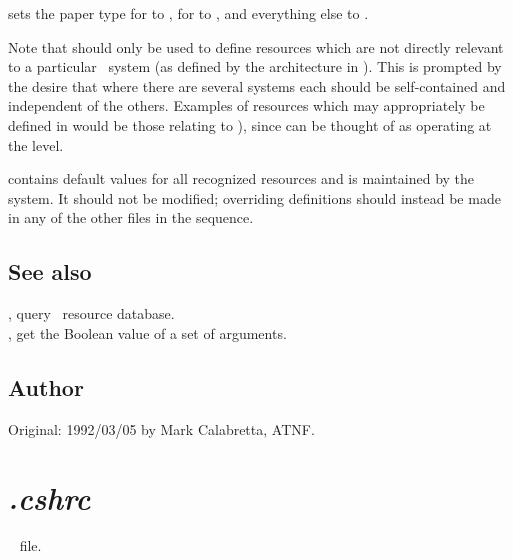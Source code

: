 \noindent
sets the paper type for  to , for  to
, and everything else to .

Note that  should only be used to define resources
which are not directly relevant to a particular \aipspp\ system (as defined by
the architecture in ).  This is prompted by the desire that
where there are several systems each should be self-contained and independent
of the others.  Examples of resources which may appropriately be defined in
 would be those relating to ), since
 can be thought of as operating at the 
level.

 contains default values for all recognized resources
and is maintained by the system.  It should not be modified; overriding
definitions should instead be made in any of the other  files in
the sequence.

\subsection*{See also}

, query \aipspp\ resource database.\\
, get the Boolean value of a set of arguments.\\

\subsection*{Author}

Original: 1992/03/05 by Mark Calabretta, ATNF.


\newpage
\section{\textit{.cshrc}}
\label{.cshrc}




\aipspp\  file.

